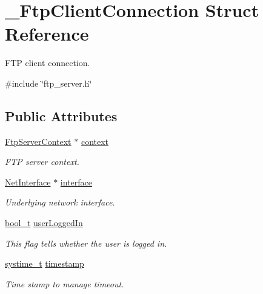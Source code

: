 \hypertarget{struct__FtpClientConnection}{}\section{\+\_\+\+Ftp\+Client\+Connection Struct Reference}
\label{struct__FtpClientConnection}


F\+TP client connection.  




{\ttfamily \#include \char`\"{}ftp\+\_\+server.\+h\char`\"{}}

\subsection*{Public Attributes}
\begin{DoxyCompactItemize}
\item 
\hyperlink{ftp__server_8h_af7294ff4e42ca4befb7414ce9fd6f287}{Ftp\+Server\+Context} $\ast$ \hyperlink{struct__FtpClientConnection_a42fb1fa2b8ee5ffae185419e75e0e0f1}{context}
\begin{DoxyCompactList}\small\item\em F\+TP server context. \end{DoxyCompactList}\item 
\hyperlink{net_8h_a2234db8911a1148c9159979d8f5e0d6b}{Net\+Interface} $\ast$ \hyperlink{struct__FtpClientConnection_a28166eba54cab14b064580e57ea8e211}{interface}
\begin{DoxyCompactList}\small\item\em Underlying network interface. \end{DoxyCompactList}\item 
\hyperlink{compiler__port_8h_a812d16e5494522586b3784e55d479912}{bool\+\_\+t} \hyperlink{struct__FtpClientConnection_a640338022687b9e562da44ad101cf82f}{user\+Logged\+In}
\begin{DoxyCompactList}\small\item\em This flag tells whether the user is logged in. \end{DoxyCompactList}\item 
\hyperlink{compiler__port_8h_ae3e32a98d431a02106616da3071832dd}{systime\+\_\+t} \hyperlink{struct__FtpClientConnection_aa023c74e606fdfae6eca5f5e10f3e362}{timestamp}
\begin{DoxyCompactList}\small\item\em Time stamp to manage timeout. \end{DoxyCompactList}\item 

\end{DoxyCompactItemize}
